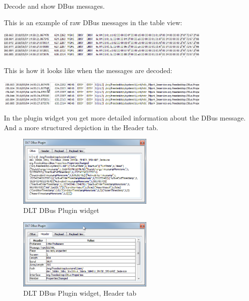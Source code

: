 \documentclass[a4paper,11pt]{article}
\begin{document}
Decode and show DBus messages.\linebreak

This is an example of raw DBus messages in the table view:\linebreak

\vspace{3mm}

\includegraphics[width=0.8\textwidth]{images/dbus_table_raw.png}

\vspace{3mm}
This is how it looks like when the messages are decoded:\linebreak

\vspace{2mm}

\includegraphics[width=0.8\textwidth]{images/dbus_table_decode.png}

\vspace{2mm}

In the plugin widget you get more detailed information about the DBus message.
And a more structured depiction in the Header tab.


\begin{figure}[H]
 \centering
\includegraphics[width=0.6\textwidth]{images/dbus_widget.png}
 \caption{DLT DBus Plugin widget}
 \label{fig:dbuspluginwidget}
\end{figure}


\begin{figure}[H]
 \centering
\includegraphics[width=0.6\textwidth]{images/dbus_widget_header.png}
 \caption{DLT DBus Plugin widget, Header tab}
 \label{fig:dbuspluginwidgetheader}
\end{figure}
\end{document}
